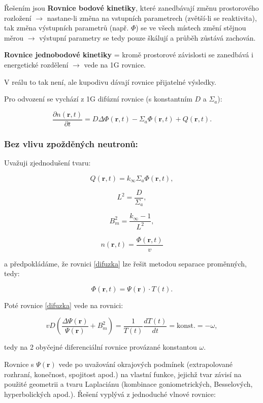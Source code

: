 Řešením jsou \textbf{Rovnice bodové kinetiky}, které zanedbávají změnu prostorového rozložení $\rightarrow$ nastane-li změna na vstupních parametrech (zvětší-li se reaktivita), tak změna výstupních parametrů (např. $\Phi$) se ve všech místech změní stějnou měrou $\rightarrow$ výstupní parametry se tedy pouze škálují a průběh zůstává zachován.

\textbf{Rovnice jednobodové kinetiky} = kromě prostorové závislosti se zanedbává i energetické rozdělení $\rightarrow$ vede na 1G rovnice.

V reálu to tak není, ale kupodivu dávají rovnice přijatelné výsledky.

Pro odvození se vychází z 1G difúzní rovnice (s konstantním $D$ a $\Sigma_a$):

\begin{equation}
  \boxed{
  \dfrac{\partial n(\textbf{r}, t)}{\partial t} = D \Delta \Phi (\textbf{r}, t) - \Sigma_a \Phi (\textbf{r}, t) + Q (\textbf{r}, t).
  \label{difuzka}}
\end{equation}

\subsubsection{Bez vlivu zpožděných neutronů:}

Uvažuji zjednodušení tvaru:

$$ Q (\textbf{r}, t) = k_\infty \Sigma_a \Phi (\textbf{r}, t), $$

$$ L^2 = \dfrac{D}{\Sigma_a}, $$

$$ B_m^2 = \dfrac{k_\infty - 1}{L^2}, $$

$$ n(\textbf{r}, t) = \dfrac{\Phi (\textbf{r}, t)}{v}$$

a předpokládáme, že rovnici \eqref{difuzka} lze řešit metodou separace proměnných, tedy:

$$ \Phi (\textbf{r}, t) = \Psi (\textbf{r}) \cdot T(t). $$

Poté rovnice \eqref{difuzka} vede na rovnici:

\begin{equation}
  v D \left ( \dfrac{\Delta \Psi (\textbf{r})}{\Psi (\textbf{r})} + B_m^2 \right ) = \dfrac{1}{T(t)} \dfrac{d T(t)}{d t} = \text{konst.} = - \omega,
  \label{difuzka_v_separaci}
\end{equation}

\noindent tedy na 2 obyčejné diferenciální rovnice provázané konstantou $\omega$.

Rovnice s $\Psi (\textbf{r})$ vede po uvažování okrajových podmínek (extrapolované rozhraní, konečnost, spojitost apod.) na vlastní funkce, jejichž tvar závisí na použité geometrii a tvaru Laplaciánu (kombinace goniometrických, Besselových, hyperbolických apod.). Řešení vyplývá z jednoduché vlnové rovnice:

